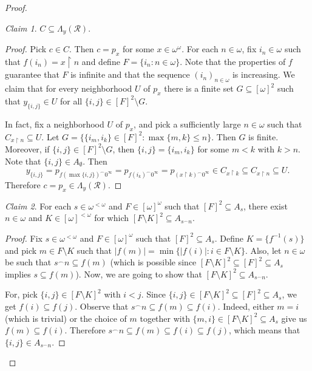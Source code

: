 \documentclass{amsart}
\theoremstyle{plain}
\theoremstyle{definition}
\theoremstyle{remark}
\newtheorem{claim}{Claim}
\begin{document}
\begin{proof}
\setcounter{claim}{0}
\begin{claim}\label{claim:inclusionA1}
    $C\subseteq\Lambda_y(\mathcal{R})$.
\end{claim}
\begin{proof}
    Pick $c\in C$. Then $c=p_x$ for some $x\in\omega^\omega$. For each $n\in\omega$, fix $i_n\in\omega$ such that $f(i_n)=x\restriction n$ and define $F=\{i_n:n\in\omega\}$. Note that the properties of $f$ guarantee that $F$ is infinite and that the sequence $(i_n)_{n\in\omega}$ is increasing. 
We claim that for every neighborhood $U$ of $p_x$ there is a finite set $G\subseteq[\omega]^2$ such that $y_{\{i,j\}}\in U$ for all $\{i,j\}\in [F]^2\setminus G$. 

In fact, fix a neighborhood $U$ of $p_x$, and pick a sufficiently large $n \in \omega$ such that $C_{x\restriction n}\subseteq U$. Let $G=\{\{i_m,i_k\}\in[F]^2: \max\{m,k\}\leq n\}$. Then $G$ is finite. Moreover, if $\{i,j\}\in[F]^2\setminus G$, then $\{i,j\}=\{i_m,i_k\}$ for some $m<k$ with $k>n$. Note that $\{i,j\}\in A_\emptyset$. Then 
\begin{equation*}
y_{\{i,j\}}=p_{f(\max\{i,j\})^\frown 0^\infty}=p_{f(i_k)^\frown 0^\infty}=p_{(x\restriction k)^\frown 0^\infty}\in C_{x\restriction k}\subseteq C_{x\restriction n}\subseteq U.
\end{equation*}
Therefore $c=p_x \in \Lambda_y(\mathcal{R})$. 
\end{proof}

\begin{claim}\label{claim:middleA}
For each $s\in\omega^{<\omega}$ and $F\in[\omega]^\omega$ such that $[F]^2\subseteq A_s$, there exist $n\in\omega$ and $K\in[\omega]^{<\omega}$ for which $[F\setminus K]^2\subseteq A_{s^\frown n}$. 
\end{claim}
\begin{proof}
Fix $s\in\omega^{<\omega}$ and $F\in[\omega]^\omega$ such that $[F]^2\subseteq A_s$. Define $K=\{f^{-1}(s)\}$ and pick $m\in F\setminus K$ such that $|f(m)|=\min\{|f(i)|: i\in F\setminus K\}$. Also, let $n\in\omega$ be such that $s^\frown n\subseteq f(m)$ (which is possible since $[F\setminus K]^2\subseteq [F]^2\subseteq A_s$ implies $s\subseteq f(m)$). Now, we are going to show that $[F\setminus K]^2\subseteq A_{s^\frown n}$. 

For, pick $\{i,j\}\in [F\setminus K]^2$ with $i<j$. Since $\{i,j\}\in[F\setminus K]^2\subseteq [F]^2\subseteq A_s$, we get $f(i)\subseteq f(j)$. Observe that $s^\frown n\subseteq f(m)\subseteq f(i)$. Indeed, either $m=i$ (which is trivial) or the choice of $m$ together with $\{m,i\}\in[F\setminus K]^2\subseteq A_s$ give us $f(m)\subseteq f(i)$. Therefore $s^\frown n\subseteq f(m)\subseteq f(i)\subseteq f(j)$, which means that $\{i,j\}\in A_{s^\frown n}$. %
\end{proof}


\end{proof}
\end{document}
